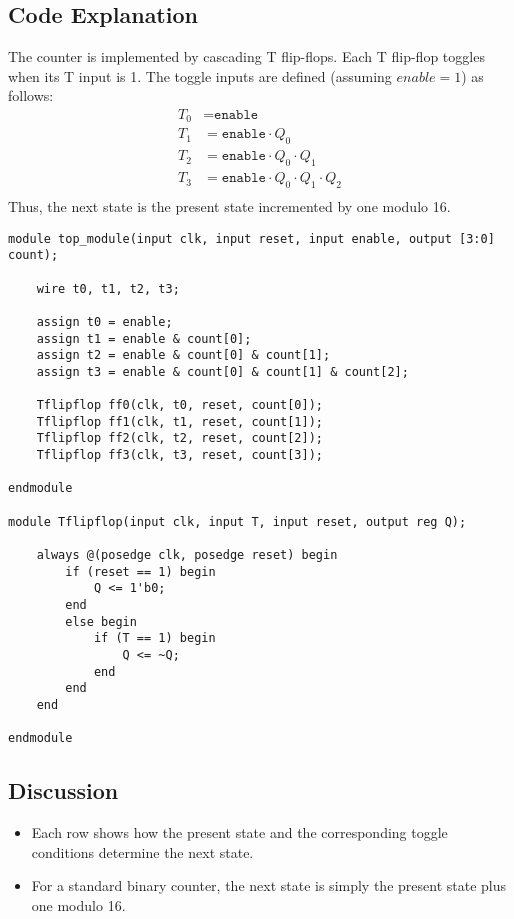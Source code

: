 \documentclass[11pt]{article}
\begin{document}
\subsection{Code Explanation}
The counter is implemented by cascading T flip-flops. Each T flip-flop toggles when its T input is 1. The toggle inputs are defined (assuming \({enable}=1\)) as follows:
\[
\begin{aligned}
T_0 &= \texttt{enable} \\
T_1 &= \texttt{enable} \cdot Q_0 \\
T_2 &= \texttt{enable} \cdot Q_0 \cdot Q_1 \\
T_3 &= \texttt{enable} \cdot Q_0 \cdot Q_1 \cdot Q_2 \\
\end{aligned}
\]
Thus, the next state is the present state incremented by one modulo 16.

\begin{lstlisting}[style=verilogstyle, caption={4-bit Up Counter}]
module top_module(input clk, input reset, input enable, output [3:0] count);

    wire t0, t1, t2, t3;

    assign t0 = enable;
    assign t1 = enable & count[0];
    assign t2 = enable & count[0] & count[1];
    assign t3 = enable & count[0] & count[1] & count[2];   
    
    Tflipflop ff0(clk, t0, reset, count[0]);
    Tflipflop ff1(clk, t1, reset, count[1]);
    Tflipflop ff2(clk, t2, reset, count[2]);
    Tflipflop ff3(clk, t3, reset, count[3]);

endmodule

module Tflipflop(input clk, input T, input reset, output reg Q);

    always @(posedge clk, posedge reset) begin
        if (reset == 1) begin
            Q <= 1'b0;
        end
        else begin
            if (T == 1) begin
                Q <= ~Q;
            end
        end
    end

endmodule
\end{lstlisting}

\subsection{Discussion}
\begin{itemize}
    \item Each row shows how the present state and the corresponding toggle conditions determine the next state.
    \item For a standard binary counter, the next state is simply the present state plus one modulo 16.
\end{itemize}
\end{document}
